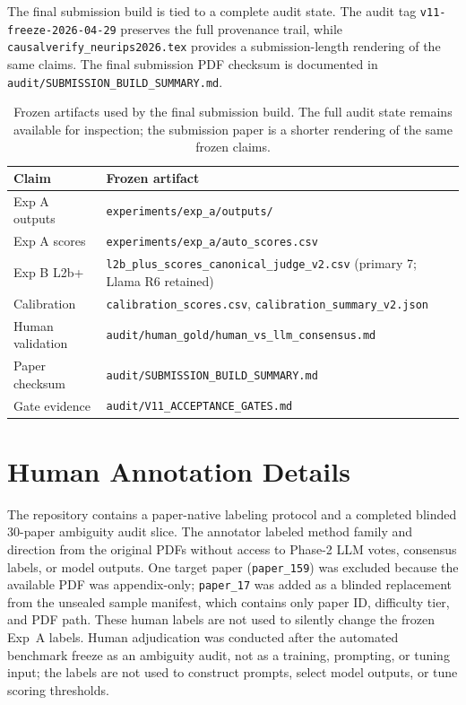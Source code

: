 \documentclass{article}
\begin{document}
The final submission build is tied to a complete audit state. The audit tag
\texttt{v11-freeze-2026-04-29} preserves the full provenance trail, while
\texttt{causalverify\_neurips2026.tex} provides a submission-length rendering
of the same claims. The final submission PDF checksum is documented in
\texttt{audit/SUBMISSION\_BUILD\_SUMMARY.md}.

\begin{table}[h]
\centering
\caption{Frozen artifacts used by the final submission build. The full audit
state remains available for inspection; the submission paper is a shorter
rendering of the same frozen claims.}
\label{tab:artifacts}
\small
\renewcommand{\arraystretch}{1.12}
\begin{tabular}{ll}
\toprule
\textbf{Claim} & \textbf{Frozen artifact} \\
\midrule
Exp A outputs & \texttt{experiments/exp\_a/outputs/} \\
Exp A scores & \texttt{experiments/exp\_a/auto\_scores.csv} \\
Exp B L2b+ & \texttt{l2b\_plus\_scores\_canonical\_judge\_v2.csv} (primary 7; Llama R6 retained) \\
Calibration & \texttt{calibration\_scores.csv}, \texttt{calibration\_summary\_v2.json} \\
Human validation & \texttt{audit/human\_gold/human\_vs\_llm\_consensus.md} \\
Paper checksum & \texttt{audit/SUBMISSION\_BUILD\_SUMMARY.md} \\
Gate evidence & \texttt{audit/V11\_ACCEPTANCE\_GATES.md} \\
\bottomrule
\end{tabular}
\end{table}

\section{Human Annotation Details}
\label{app:human}

The repository contains a paper-native labeling protocol and a completed
blinded 30-paper ambiguity audit slice. The annotator labeled method family and
direction from the original PDFs without access to Phase-2 LLM votes, consensus
labels, or model outputs. One target paper (\texttt{paper\_159}) was excluded
because the available PDF was appendix-only; \texttt{paper\_17} was added as a
blinded replacement from the unsealed sample manifest, which contains only
paper ID, difficulty tier, and PDF path. These human labels are not used to
silently change the frozen Exp~A labels. Human adjudication was conducted after
the automated benchmark freeze as an ambiguity audit, not as a training,
prompting, or tuning input; the labels are not used to construct prompts,
select model outputs, or tune scoring thresholds.
\end{document}
